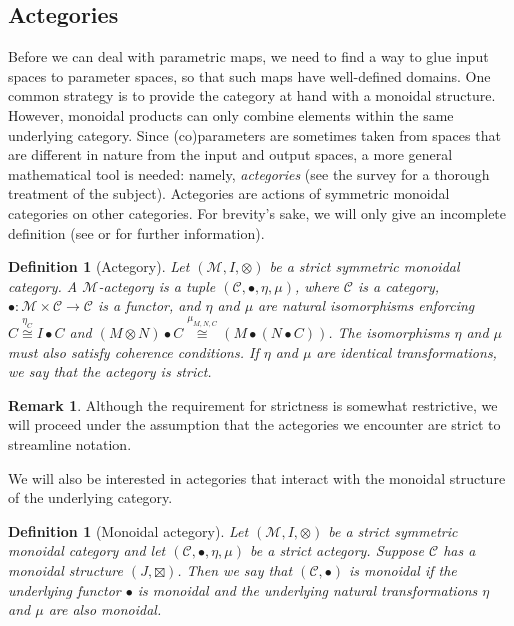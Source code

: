 \documentclass[11pt,a4paper,openright,twoside]{report}
\newcounter{mycounter}
\theoremstyle{plain}
\newtheorem{definition}[mycounter]{Definition}
\theoremstyle{definition}
\newtheorem{remark}[mycounter]{Remark}
\begin{document}
\subsection{Actegories}

Before we can deal with parametric maps, we need to find a way to glue input spaces to parameter spaces, so that such maps have well-defined domains. One common strategy is to provide the category at hand with a monoidal structure. However, monoidal products can only combine elements within the same underlying category. Since (co)parameters are sometimes taken from spaces that are different in nature from the input and output spaces, a more general mathematical tool is needed: namely, \textit{actegories} (see the survey \cite{capucci2022actegories} for a thorough treatment of the subject).  Actegories are actions of symmetric monoidal categories on other categories. For brevity's sake, we will only give an incomplete definition (see \cite{capucci2022actegories} or \cite{gavranovic2024fundamental} for further information).

\begin{definition}[Actegory]
  Let $(\mathcal{M},I,\otimes)$ be a strict symmetric monoidal category. A $\mathcal{M}$-actegory is a tuple $(\mathcal{C}, \bullet, \eta, \mu)$, where $\mathcal{C}$ is a category, $\bullet: \mathcal{M} \times \mathcal{C} \to \mathcal{C}$ is a functor, and $\eta$ and $\mu$ are natural isomorphisms enforcing $C \stackrel{\eta_C}{\cong}I \bullet C$ and $(M \otimes N) \bullet C \stackrel{\mu_{M,N,C}}{\cong} (M \bullet (N \bullet C))$.
  The isomorphisms $\eta$ and $\mu$ must also satisfy coherence conditions. If $\eta$ and $\mu$ are identical transformations, we say that the actegory is strict.
\end{definition}

\begin{remark}
  Although the requirement for strictness is somewhat restrictive, we will proceed under the assumption that the actegories we encounter are strict to streamline notation.
\end{remark}

We will also be interested in actegories that interact with the monoidal structure of the underlying category.

\begin{definition}[Monoidal actegory]
  Let $(\mathcal{M},I,\otimes)$ be a strict symmetric monoidal category and let $(\mathcal{C}, \bullet, \eta, \mu)$ be a strict actegory. Suppose $\mathcal{C}$ has a monoidal structure $(J,\boxtimes)$. Then we say that $(\mathcal{C}, \bullet)$ is monoidal if the underlying functor $\bullet$ is monoidal and the underlying natural transformations $\eta$ and $\mu$ are also monoidal.
\end{definition}
\end{document}
